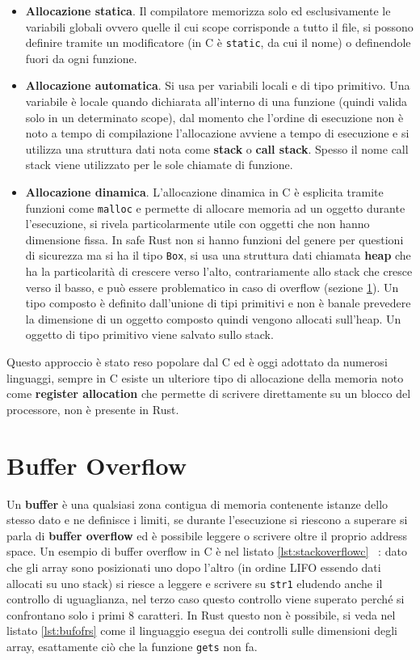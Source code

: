\documentclass[Lau,binding=0.6cm]{sapthesis}
\newcommand{\textcode}[1]{\colorbox{backcolour}{\texttt{#1}}}
\begin{document}
\begin{itemize}
    \item \textbf{Allocazione statica}. Il compilatore memorizza solo ed esclusivamente le variabili globali ovvero quelle il cui scope corrisponde a tutto il file, si possono definire tramite un modificatore (in C è \textcode{static}, da cui il nome) o definendole fuori da ogni funzione.  
    \item \textbf{Allocazione automatica}. Si usa per variabili locali e di tipo primitivo. Una variabile è locale quando dichiarata all'interno di una funzione (quindi valida solo in un determinato scope), dal momento che l'ordine di esecuzione non è noto a tempo di compilazione l'allocazione avviene a tempo di esecuzione e si utilizza una struttura dati nota come \textbf{stack} o \textbf{call stack}. 
    Spesso il nome call stack viene utilizzato per le sole chiamate di funzione. 
    \item \textbf{Allocazione dinamica}. L'allocazione dinamica in C è esplicita tramite funzioni come \textcode{malloc} e permette di allocare memoria ad un oggetto durante l'esecuzione, si rivela particolarmente utile con oggetti che non hanno dimensione fissa. 
    In safe Rust non si hanno funzioni del genere per questioni di sicurezza ma si ha il tipo \textcode{Box}, si usa una struttura dati chiamata \textbf{heap} che ha la particolarità di crescere verso l'alto, contrariamente allo stack che cresce verso il basso, e può essere problematico in caso di overflow (sezione \ref{sec:buffer_overflow}). 
    Un tipo composto è definito dall'unione di tipi primitivi e non è banale prevedere la dimensione di un oggetto composto quindi vengono allocati sull'heap. 
    Un oggetto di tipo primitivo viene salvato sullo stack. 
\end{itemize}

Questo approccio è stato reso popolare dal C ed è oggi adottato da numerosi linguaggi, sempre in C esiste un ulteriore tipo di allocazione della memoria noto come \textbf{register allocation} che permette di scrivere direttamente su un blocco del processore, non è presente in Rust.

\section{Buffer Overflow} \label{sec:buffer_overflow}
Un \textbf{buffer} è una qualsiasi zona contigua di memoria contenente istanze dello stesso dato e ne definisce i limiti, se durante l'esecuzione si riescono a superare si parla di \textbf{buffer overflow} ed è possibile leggere o scrivere oltre il proprio address space. 
Un esempio di buffer overflow in C è nel listato \ref{lst:stackoverflowc} ~\cite[7.5]{stallings:os}: dato che gli array sono posizionati uno dopo l'altro (in ordine LIFO essendo dati allocati su uno stack) si riesce a leggere e scrivere su \textcode{str1} eludendo anche il controllo di uguaglianza, nel terzo caso questo controllo viene superato perché si confrontano solo i primi 8 caratteri.
In Rust questo non è possibile, si veda nel listato \ref{lst:bufofrs} come il linguaggio esegua dei controlli sulle dimensioni degli array, esattamente ciò che la funzione \textcode{gets} non fa. 
\end{document}
